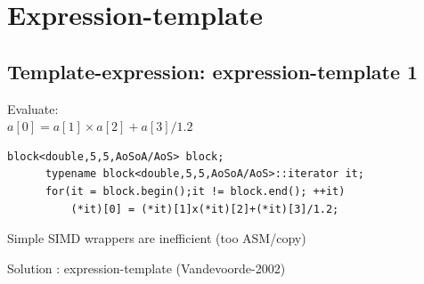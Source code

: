 \documentclass{beamer}
\begin{document}
\section[Expression-template]{Expression-template}
\subsection*{Template-expression: expression-template 1}
\begin{frame}[fragile]
Evaluate: \\
\centering
$\boxed{a[0] = a[1]  \times a[2]  +a[3]/1.2}$

\vspace{0.5cm}

\begin{lstlisting}[flexiblecolumns=true,basicstyle=\sffamily]     
      block<double,5,5,AoSoA/AoS> block;
      typename block<double,5,5,AoSoA/AoS>::iterator it;
      for(it = block.begin();it != block.end(); ++it)
          (*it)[0] = (*it)[1]x(*it)[2]+(*it)[3]/1.2;
\end{lstlisting}
\vspace{0.5cm}

Simple SIMD wrappers are inefficient (too ASM/copy)

Solution : expression-template (Vandevoorde-2002)




\end{frame}



\end{document}
